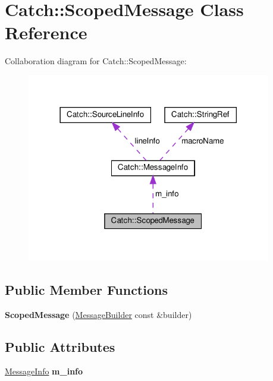 \hypertarget{classCatch_1_1ScopedMessage}{}\section{Catch\+::Scoped\+Message Class Reference}
\label{classCatch_1_1ScopedMessage}


Collaboration diagram for Catch\+::Scoped\+Message\+:\nopagebreak
\begin{figure}[H]
\begin{center}
\leavevmode
\includegraphics[width=302pt]{classCatch_1_1ScopedMessage__coll__graph}
\end{center}
\end{figure}
\subsection*{Public Member Functions}
\begin{DoxyCompactItemize}
\item 
\mbox{\label{classCatch_1_1ScopedMessage_a5cc59f0f2ebe840e6607f83004d49a17}} 
{\bfseries Scoped\+Message} (\mbox{\hyperlink{structCatch_1_1MessageBuilder}{Message\+Builder}} const \&builder)
\end{DoxyCompactItemize}
\subsection*{Public Attributes}
\begin{DoxyCompactItemize}
\item 
\mbox{\label{classCatch_1_1ScopedMessage_ae6e1476f389cc6e1586f033b3747b27b}} 
\mbox{\hyperlink{structCatch_1_1MessageInfo}{Message\+Info}} {\bfseries m\+\_\+info}
\end{DoxyCompactItemize}


